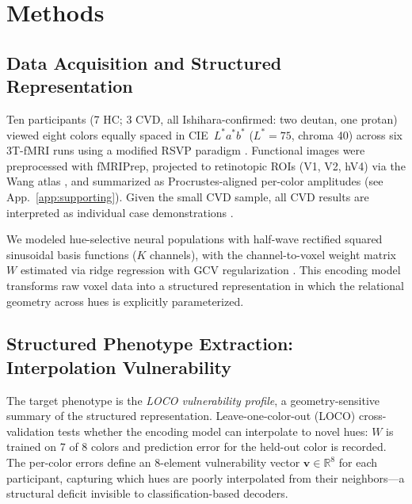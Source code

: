 \documentclass{article}
\begin{document}
\section{Methods}
\label{sec:methods}

\subsection{Data Acquisition and Structured Representation}

Ten participants (7 HC; 3 CVD, all Ishihara-confirmed: two deutan, one protan) viewed eight colors equally spaced in CIE~$L^*a^*b^*$ ($L^* = 75$, chroma 40) across six 3T-fMRI runs using a modified RSVP paradigm \citep{brouwer2009}.
Functional images were preprocessed with fMRIPrep, projected to retinotopic ROIs (V1, V2, hV4) via the Wang atlas \citep{wang2015}, and summarized as Procrustes-aligned per-color amplitudes (see App.~\ref{app:supporting}).
Given the small CVD sample, all CVD results are interpreted as individual case demonstrations \citep{crawford1998}.

We modeled hue-selective neural populations with half-wave rectified squared sinusoidal basis functions \citep{brouwer2009} ($K$ channels), with the channel-to-voxel weight matrix $W$ estimated via ridge regression with GCV regularization \citep{golub1979}.
This encoding model transforms raw voxel data into a structured representation in which the relational geometry across hues is explicitly parameterized.

\subsection{Structured Phenotype Extraction: Interpolation Vulnerability}

The target phenotype is the \emph{LOCO vulnerability profile}, a geometry-sensitive summary of the structured representation.
Leave-one-color-out (LOCO) cross-validation tests whether the encoding model can interpolate to novel hues: $W$ is trained on 7 of 8 colors and prediction error for the held-out color is recorded.
The per-color errors define an 8-element vulnerability vector $\mathbf{v} \in \mathbb{R}^8$ for each participant, capturing which hues are poorly interpolated from their neighbors---a structural deficit invisible to classification-based decoders.
\end{document}
